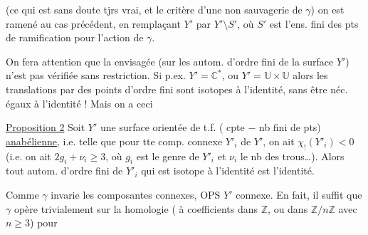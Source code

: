 (ce qui est sans doute tjrs vrai, et  le critère d'une non sauvagerie de $\gamma$) on est ramené au cas précédent, en  remplaçant $Y'$ par $Y'\setminus S'$, où $S'$ est l'ens. fini des pts de ramification pour l'action de $\gamma$. 

On fera attention que la   envisagée  (sur les autom. d'ordre fini de la surface $Y'$) n'est pas vérifiée sans restriction. Si p.ex. $Y'=\mathbb{C}^*$, ou $Y'=\mathbb{U}\times\mathbb{U}$ alors les translations par des points d'ordre fini sont isotopes à l'identité, sans être néc. égaux à l'identité ! Mais on a ceci

\uline{Proposition 2} Soit $Y'$ une surface orientée de t.f. ( cpte $-$ nb fini de pts) \uline{anabélienne}, i.e. telle que pour tte comp. connexe $Y'_i$ de $Y'$, on ait $\chi_!(Y'_i)<0$ (i.e. on ait $2g_i+\nu_i\geq 3$, où $g_i$ est le genre de $Y'_i$ et $\nu_i$ le nb des trous\ldots). Alors tout autom. \inserted{$\gamma$} d'ordre fini de $Y'_i$ qui est isotope à l'identité est l'identité.

Comme $\gamma$ invarie les composantes connexes, OPS $Y'$ connexe. En fait, il suffit que $\gamma$ opère trivialement sur la homologie  ( à coefficients dans $\mathbb{Z}$, ou dans  $\mathbb{Z}/n\mathbb{Z}$ avec $n\geq3$) pour
